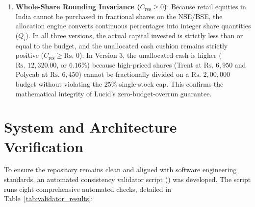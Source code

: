 \begin{enumerate}
    \item \textbf{Whole-Share Rounding Invariance ($C_{\text{res}} \ge 0$)}:
    Because retail equities in India cannot be purchased in fractional shares on the NSE/BSE, the allocation engine converts continuous percentages into integer share quantities ($Q_i$). In all three versions, the actual capital invested is strictly less than or equal to the budget, and the unallocated cash cushion remains strictly positive ($C_{\text{res}} \ge \text{Rs.~}0$). In Version 3, the unallocated cash is higher ($\text{Rs.~}12,320.00$, or $6.16\%$) because high-priced shares (Trent at $\text{Rs.~}6,950$ and Polycab at $\text{Rs.~}6,450$) cannot be fractionally divided on a $\text{Rs.~}2,00,000$ budget without violating the $25\%$ single-stock cap. This confirms the mathematical integrity of Lucid's zero-budget-overrun guarantee.
\end{enumerate}

\section{System and Architecture Verification}
To ensure the repository remains clean and aligned with software engineering standards, an automated consistency validator script () was developed. The script runs eight comprehensive automated checks, detailed in Table~\ref{tab:validator_results}:

